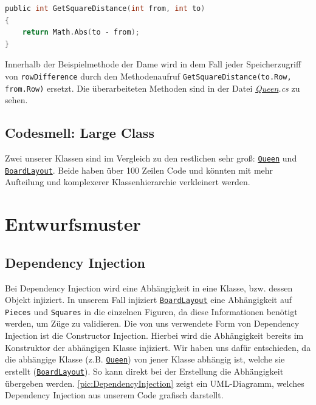 \documentclass[
10pt, %
a4paper, %
oneside, %
headinclude,footinclude, %
BCOR5mm, %
]{scrartcl}
\begin{document}
\begin{onehalfspace}
\begin{lstlisting}[language=c, style=mStyle]
public int GetSquareDistance(int from, int to)
{
	return Math.Abs(to - from);
}
\end{lstlisting}

Innerhalb der Beispielmethode der Dame wird in dem Fall jeder Speicherzugriff von \texttt{rowDifference} durch den Methodenaufruf \texttt{GetSquareDistance(to.Row, from.Row)} ersetzt. Die überarbeiteten Methoden sind in der Datei \textit{\href{https://github.com/schmida736/Chess-AdvancedSE/blob/main/Chess-AdvancedSE/Game\%20Elements/Pieces/Queen.cs}{Queen}.cs} zu sehen. 

\subsection{Codesmell: Large Class}
Zwei unserer Klassen sind im Vergleich zu den restlichen sehr groß: \texttt{\href{https://github.com/schmida736/Chess-AdvancedSE/blob/main/Chess-AdvancedSE/Game\%20Elements/Pieces/Queen.cs}{Queen}} und \texttt{\href{https://github.com/schmida736/Chess-AdvancedSE/blob/main/Chess-AdvancedSE/Game\%20Elements/BoardLayout.cs}{BoardLayout}}. Beide haben über 100 Zeilen Code und könnten mit mehr Aufteilung und komplexerer Klassenhierarchie verkleinert werden.

\newpage
\section{Entwurfsmuster}

\subsection{Dependency Injection}
\label{sec:depInjec}
Bei Dependency Injection wird eine Abhängigkeit in eine Klasse, bzw. dessen Objekt injiziert. In unserem Fall injiziert \texttt{\href{https://github.com/schmida736/Chess-AdvancedSE/blob/main/Chess-AdvancedSE/Game\%20Elements/BoardLayout.cs}{BoardLayout}} eine Abhängigkeit auf \texttt{Pieces} und \texttt{Squares} in die einzelnen Figuren, da diese Informationen benötigt werden, um Züge zu validieren. Die von uns verwendete Form von Dependency Injection ist die Constructor Injection. Hierbei wird die Abhängigkeit bereits im Konstruktor der abhängigen Klasse injiziert. Wir haben uns dafür entschieden, da die abhängige Klasse (z.B. \texttt{\href{https://github.com/schmida736/Chess-AdvancedSE/blob/main/Chess-AdvancedSE/Game\%20Elements/Pieces/Queen.cs}{Queen}}) von jener Klasse abhängig ist, welche sie erstellt (\texttt{\href{https://github.com/schmida736/Chess-AdvancedSE/blob/main/Chess-AdvancedSE/Game\%20Elements/BoardLayout.cs}{BoardLayout}}). So kann direkt bei der Erstellung die Abhängigkeit übergeben werden. \autoref{pic:DependencyInjection} zeigt ein UML-Diagramm, welches Dependency Injection aus unserem Code grafisch darstellt.


\end{onehalfspace}
\end{document}

